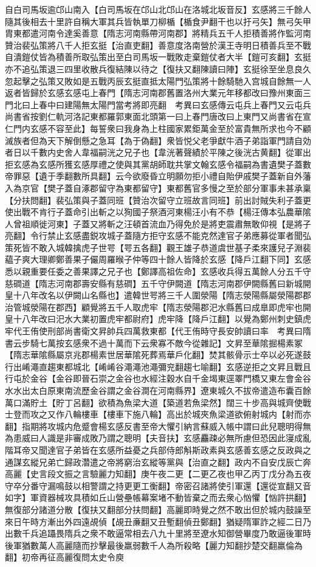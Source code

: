 自白司馬坂逾邙山南入【白司馬坂在邙山北邙山在洛城北坂音反】玄感將三千餘人隨其後相去十里許自稱大軍其兵皆執單刀柳楯【楯食尹翻干也以扜弓矢】無弓矢甲胄東都遣河南令達奚善意【隋志河南縣帶河南郡】將精兵五千人拒積善將作監河南贊治裴弘策將八千人拒玄挺【治直吏翻】善意度洛南營於漢王寺明日積善兵至不戰自潰鎧仗皆為積善所取弘策出至白司馬坂一戰敗走棄鎧仗者大半【鎧可亥翻】玄挺亦不追弘策退三四里收散兵復結陳以待之【復扶又翻陳讀曰陣】玄挺徐至坐息良久忽起擊之弘策又敗如是五戰丙辰玄挺直抵太陽門弘策將十餘騎馳入宫城自餘無一人返者皆歸於玄感玄感屯上春門【隋志河南郡舊置洛州大業元年移都改曰豫州東面三門北曰上春中曰建陽無太陽門當考將即亮翻　考異曰玄感傳云屯兵上春門又云屯兵尚書省按劉仁軌河洛記東都羅郭東面北頭第一曰上春門唐改曰上東門又尚書省在宣仁門内玄感不容至此】每誓衆曰我身為上柱國家累鉅萬金至於富貴無所求也今不顧滅族者但為天下解倒懸之急耳【為于偽翻】衆皆悦父老爭獻牛酒子弟詣軍門請自効者日以千數内史舍人韋福嗣洸之兄子也【韋洸著聲績於平陳之後洸古黄翻】從軍出拒玄感為玄感所獲玄感厚禮之使與其黨胡師耽共掌文翰玄感令福嗣為書遺樊子蓋數帝罪惡【遺于季翻數所具翻】云今欲廢昏立明願勿拒小禮自貽伊戚樊子蓋新自外藩入為京官【樊子蓋自涿郡留守為東都留守】東都舊官多慢之至於部分軍事未甚承稟【分扶問翻】裴弘策與子蓋同班【贊治次留守立班故言同班】前出討賊失利子蓋更使出戰不肯行子蓋命引出斬之以狥國子祭酒河東楊汪小有不恭【楊汪傳本弘農華隂人曾祖順徙河東】子蓋又將斬之汪頓首流血乃得免於是將吏震肅無敢仰視【是將子亮翻】令行禁止玄感盡鋭攻城子蓋隨方拒守玄感不能克然達官子弟應募從軍者聞弘策死皆不敢入城韓擒虎子世咢【咢五各翻】觀王雄子恭道虞世基子柔來護兒子淵裴藴子爽大理卿鄭善果子儼周羅㬋子仲等四十餘人皆降於玄感【降戶江翻下同】玄感悉以親重要任委之善果譯之兄子也【鄭譯高祖佐命】玄感收兵得五萬餘人分五千守慈磵道【隋志河南郡壽安縣有慈磵】五千守伊闕道【隋志河南郡伊闕縣舊曰新城開皇十八年改名以伊闕山名縣也】遣韓世咢將三千人圍滎陽【隋志滎陽縣屬滎陽郡郡治管城滎陽在郡西】顧覺將五千人取虎牢【隋志滎陽郡汜水縣舊曰成臯即虎牢也開皇十八年改曰汜水大業初置虎牢都尉府】虎牢降【降戶江翻】以覺為鄭州刺史鎮虎牢代王侑使刑部尚書衛文昇帥兵四萬救東都【代王侑時守長安帥讀曰率　考異曰隋書云步騎七萬按玄感衆不過十萬而下云衆寡不敵今從雜記】文昇至華隂掘楊素冢【隋志華隂縣屬京兆郡楊素世居華隂死葬焉華戶化翻】焚其骸骨示士卒以必死遂鼓行出崤澠直趨東都城北【崤崤谷澠澠池澠彌兖翻趨七喻翻】玄感逆拒之文昇且戰且行屯於金谷【金谷即晉石崇之金谷也水經注穀水自千金堨東逕睪門橋又東左會金谷水水出太白原東南流歷金谷謂之金谷澗在河南縣界】遼東城久不拔帝遣造布囊百餘萬口滿貯土【貯丁呂翻】欲積為魚梁大道【築道若魚梁然】闊三十步高與城齊使戰士登而攻之又作八輪樓車【樓車下施八輪】高出於城夾魚梁道欲俯射城内【射而亦翻】指期將攻城内危蹙會楊玄感反書至帝大懼引納言蘇威入帳中謂曰此兒聰明得無為患威曰人識是非審成敗乃謂之聰明【夫音扶】玄感麤疎必無所慮但恐因此寖成亂階耳帝又聞達官子弟皆在玄感所益憂之兵部侍郎斛斯政素與玄感善玄感之反政與之通謀玄縱兄弟亡歸政濳遣之帝將窮治玄縱等黨與【治直之翻】政内不自安戊辰亡奔高麗【史言段文振之言驗麗力知翻】庚午夜二更【二更乙夜也甲乙丙丁戊分為五夜守卒分番守漏鳴鼓以相警謂之持更更工衡翻】帝密召諸將使引軍還【還從宣翻又音如字】軍資器械攻具積如丘山營壘帳幕案堵不動皆棄之而去衆心忷懼【忷許拱翻】無復部分諸道分散【復扶又翻部分扶問翻】高麗即時覺之然不敢出但於城内鼓譟至來日午時方漸出外四遠覘偵【覘丑亷翻又丑塹翻偵丑鄭翻】猶疑隋軍詐之經二日乃出數千兵追躡畏隋兵之衆不敢逼常相去八九十里將至遼水知御營畢度乃敢逼後軍時後軍猶數萬人高麗隨而抄擊最後羸弱數千人為所殺略【麗力知翻抄楚交翻羸倫為翻】初帝再征高麗復問太史令庾